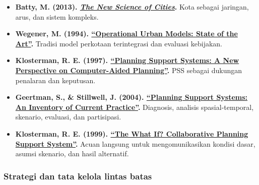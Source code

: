 \documentclass[
  indonesian,
  11pt,
  a4paper,
  oneside,
  openany]{report}
\providecommand{\tightlist}{%
  \setlength{\itemsep}{0pt}\setlength{\parskip}{0pt}}
\begin{document}
\begin{itemize}
\tightlist
\item
  \textbf{Batty, M. (2013).
  \href{https://mitpress.mit.edu/9780262534567/the-new-science-of-cities/}{\emph{The
  New Science of Cities}}.} Kota sebagai jaringan, arus, dan sistem
  kompleks.
\item
  \textbf{Wegener, M. (1994).
  \href{https://doi.org/10.1080/01944369408975547}{``Operational Urban
  Models: State of the Art''}.} Tradisi model perkotaan terintegrasi dan
  evaluasi kebijakan.
\item
  \textbf{Klosterman, R. E. (1997).
  \href{https://doi.org/10.1177/0739456X9701700105}{``Planning Support
  Systems: A New Perspective on Computer-Aided Planning''}.} PSS sebagai
  dukungan penalaran dan keputusan.
\item
  \textbf{Geertman, S., \& Stillwell, J. (2004).
  \href{https://doi.org/10.1016/S0198-9715(03)00024-3}{``Planning
  Support Systems: An Inventory of Current Practice''}.} Diagnosis,
  analisis spasial-temporal, skenario, evaluasi, dan partisipasi.
\item
  \textbf{Klosterman, R. E. (1999).
  \href{https://doi.org/10.1068/b260393}{``The What If? Collaborative
  Planning Support System''}.} Acuan langsung untuk mengomunikasikan
  kondisi dasar, asumsi skenario, dan hasil alternatif.
\end{itemize}

\subsubsection{Strategi dan tata kelola lintas
batas}\label{strategi-dan-tata-kelola-lintas-batas}
\end{document}
